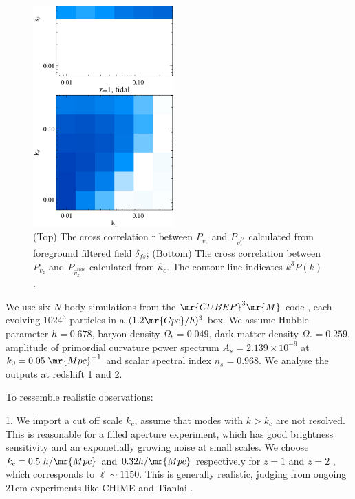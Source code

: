 \begin{figure}[tbp]
\begin{center}
\includegraphics[width=0.48\textwidth]{compare_powv2d_z1z2.eps}
\end{center}
\vspace{-0.7cm}
\caption{(Top) The cross correlation r between $P_{v_z}$ and 
    $P_{\hat v_z^{fs}}$ calculated from foreground filtered field $\delta_{fs}$; 
    (Bottom) The cross correlation between $P_{v_z}$ and $P_{\hat v_z^{tide}}$ calculated from $\hat \kappa_c$. 
The contour line indicates $k^3 P(k)$.
}
\label{fig:v}
\end{figure}
We use six $N$-body simulations from the
$\mr{CUBEP}^3\mr{M}$ code \cite{2013:code}, each evolving $1024^3$ particles in a $(1.2\mr{Gpc}/h)^3$ box. 
We assume Hubble parameter $h=0.678$, baryon
density $\Omega_{b}=0.049$, dark matter density $\Omega_{c}=0.259$,
amplitude of primordial curvature power spectrum $A_s=2.139\times10^{-9}$ at 
$k_0=0.05\;\mr{Mpc}^{-1}$ and scalar spectral index $n_s=0.968$.
We analyse the outputs at redshift 1 and 2.

To ressemble realistic observations:

1. We import a cut off scale $k_c$, assume that modes with $k>k_c$ are not resolved.
This is reasonable for a filled aperture experiment, which
has good brightness sensitivity and an exponetially growing noise at small 
scales.
We choose $k_c=0.5\ h/\mr{Mpc}$ and $0.32 h/\mr{Mpc}$ respectively for $z=1$ and $z=2$ , which corresponds
to $\ell\sim1150$. 
This is generally realistic, judging from ongoing 21cm experiments like
CHIME \cite{2014SPIE.9145E..22B}\cite{2014SPIE.9145E..4VN}
and Tianlai \cite{2012IJMPS..12..256C}\cite{2015ApJ...798...40X}.

